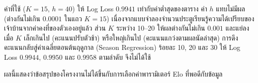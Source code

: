 ค่าที่ใช้ ($K = 15$, $h = 40$) ให้ Log Loss $0.9941$ เท่ากับค่าต่ำสุดของตาราง ค่า $h$ แทบไม่มีผล (ต่างกันไม่เกิน $0.0001$ ในแถว $K = 15$) เนื่องจากแบบจำลองจำนวนประตูเรียนรู้ความได้เปรียบของเจ้าบ้านจากค่าคงที่ของตัวเองอยู่แล้ว ส่วน $K$ ระหว่าง 10--20 ให้ผลต่างกันไม่เกิน $0.001$ และแย่ลงเมื่อ $K$ เล็กเกินไป (คะแนนปรับตัวช้า) หรือใหญ่เกินไป (คะแนนแกว่งตามผลนัดล่าสุด) การดึงคะแนนกลับสู่ค่าเฉลี่ยตอนต้นฤดูกาล (Season Regression) ร้อยละ 10, 20 และ 30 ให้ Log Loss $0.9944$, $0.9950$ และ $0.9958$ ตามลำดับ จึงไม่ได้ใช้

ผลนี้แสดงว่าข้อสรุปของโครงงานไม่ได้ขึ้นกับการเลือกค่าพารามิเตอร์ Elo ที่พอดีกับข้อมูล
